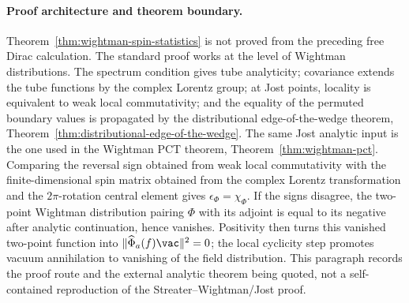 \paragraph{Proof architecture and theorem boundary.}
Theorem~\ref{thm:wightman-spin-statistics} is not proved from the preceding
free Dirac calculation.  The standard proof works at the level of Wightman
distributions.  The spectrum condition gives tube analyticity; covariance
extends the tube functions by the complex Lorentz group; at Jost points,
locality is equivalent to weak local commutativity; and the equality of the
permuted boundary values is propagated by the distributional
edge-of-the-wedge theorem, Theorem~\ref{thm:distributional-edge-of-the-wedge}.
The same Jost analytic input is the one used in the Wightman PCT theorem,
Theorem~\ref{thm:wightman-pct}.  Comparing the reversal sign obtained from
weak local commutativity with the finite-dimensional spin matrix obtained
from the complex Lorentz transformation and the \(2\pi\)-rotation central
element gives \(\epsilon_\Phi=\chi_\Phi\).  If the signs disagree, the
two-point Wightman distribution pairing \(\Phi\) with its adjoint is equal to
its negative after analytic continuation, hence vanishes.  Positivity then
turns this vanished two-point function into
\(\|\widehat\Phi_a(f)\vac\|^2=0\); the local cyclicity step promotes vacuum
annihilation to vanishing of the field distribution.  This paragraph records
the proof route and the external analytic theorem being quoted, not a
self-contained reproduction of the Streater--Wightman/Jost proof.

